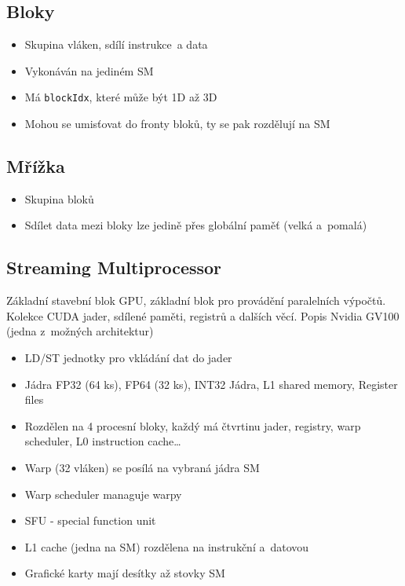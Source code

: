 \subsection{Bloky}
\begin{itemize}
    \item Skupina vláken, sdílí instrukce~a data
    \item Vykonáván na jediném SM
    \item Má \texttt{blockIdx}, které může být 1D až 3D
    \item Mohou se umisťovat do fronty bloků, ty se pak rozdělují na SM
\end{itemize}

\subsection{Mřížka}
\begin{itemize}
    \item Skupina bloků
    \item Sdílet data mezi bloky lze jedině přes globální paměť (velká a~pomalá)
\end{itemize}

\subsection{Streaming Multiprocessor}
Základní stavební blok GPU, základní blok pro provádění paralelních výpočtů.
Kolekce CUDA jader, sdílené paměti, registrů a dalších věcí. 
Popis Nvidia GV100 (jedna z~možných architektur)
\begin{itemize}
    \item LD/ST jednotky pro vkládání dat do jader
    \item Jádra FP32 (64 ks), FP64 (32 ks), INT32 Jádra, L1 shared memory, Register files
    \item Rozdělen na 4 procesní bloky, každý má čtvrtinu jader, registry, warp scheduler, L0 instruction cache\dots
    \item Warp (32 vláken) se posílá na vybraná jádra SM
    \item Warp scheduler managuje warpy
    \item SFU - special function unit
    \item L1 cache (jedna na SM) rozdělena na instrukční a~datovou
    \item Grafické karty mají desítky až stovky SM
\end{itemize}

